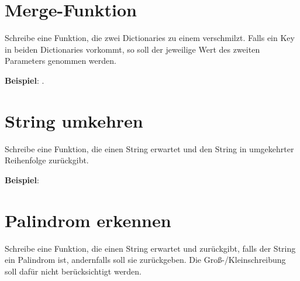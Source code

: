 \documentclass[a4paper]{article}
\begin{document}







  
\section{Merge-Funktion}
Schreibe eine Funktion, die zwei Dictionaries zu einem verschmilzt. Falls ein Key in beiden Dictionaries vorkommt, so soll der jeweilige Wert des zweiten Parameters genommen werden. 

\vspace{4pt}
\textbf{Beispiel}: .  


\section{String umkehren}
Schreibe eine Funktion, die einen String erwartet und den String in umgekehrter Reihenfolge zurückgibt. 

\vspace{4pt}
\textbf{Beispiel}:   


\section{Palindrom erkennen}
Schreibe eine Funktion, die einen String erwartet und  zurückgibt, falls der String ein Palindrom ist, andernfalls soll sie  zurückgeben. Die Groß-/Kleinschreibung soll dafür nicht berücksichtigt werden. 

\vspace{4pt}
\end{document}
